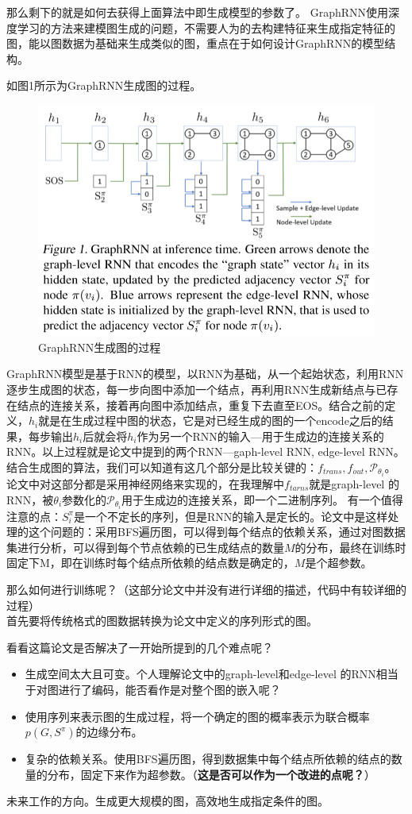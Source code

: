 那么剩下的就是如何去获得上面算法中即生成模型的参数了。
GraphRNN使用深度学习的方法来建模图生成的问题，不需要人为的去构建特征来生成指定特征的图，能以图数据为基础来生成类似的图，重点在于如何设计GraphRNN的模型结构。
\par 如图1所示为GraphRNN生成图的过程。
\begin{figure}
    \centering
    \includegraphics[width=.8\textwidth]{pics/GrpahRNN.png}
    \caption{GraphRNN生成图的过程}
\end{figure}

GraphRNN模型是基于RNN的模型，以RNN为基础，从一个起始状态，利用RNN逐步生成图的状态，每一步向图中添加一个结点，再利用RNN生成新结点与已存在结点的连接关系，接着再向图中添加结点，重复下去直至EOS。结合之前的定义，$h_i$就是在生成过程中图的状态，它是对已经生成的图的一个encode之后的结果，每步输出$h_i$后就会将$h_i$作为另一个RNN的输入---用于生成边的连接关系的RNN。以上过程就是论文中提到的两个RNN---gaph-level RNN, edge-level RNN。
结合生成图的算法，我们可以知道有这几个部分是比较关键的：$f_{trans}, f_{out}, \mathcal{P}_{\theta_i}$。论文中对这部分都是采用神经网络来实现的，在我理解中$f_{tarns}$就是graph-level 的RNN，被$\theta_i$参数化的$\mathcal{P}_{\theta_i}$用于生成边的连接关系，即一个二进制序列。
有一个值得注意的点：$S^{\pi}_i$是一个不定长的序列，但是RNN的输入是定长的。论文中是这样处理的这个问题的：采用BFS遍历图，可以得到每个结点的依赖关系，通过对图数据集进行分析，可以得到每个节点依赖的已生成结点的数量$M$的分布，最终在训练时固定下M，即在训练时每个结点所依赖的结点数是确定的，$M$是个超参数。

\par 那么如何进行训练呢？（这部分论文中并没有进行详细的描述，代码中有较详细的过程）\\
首先要将传统格式的图数据转换为论文中定义的序列形式的图。


\par 看看这篇论文是否解决了一开始所提到的几个难点呢？
\begin{itemize}
    \item 生成空间太大且可变。个人理解论文中的graph-level和edge-level 的RNN相当于对图进行了编码，能否看作是对整个图的嵌入呢？
    \item 使用序列来表示图的生成过程，将一个确定的图的概率表示为联合概率$p(G, S^{\pi})$的边缘分布。
    \item 复杂的依赖关系。使用BFS遍历图，得到数据集中每个结点所依赖的结点的数量的分布，固定下来作为超参数。（\textbf{{\color{red}这是否可以作为一个改进的点呢？}}）
\end{itemize}

\par 未来工作的方向。生成更大规模的图，高效地生成指定条件的图。
